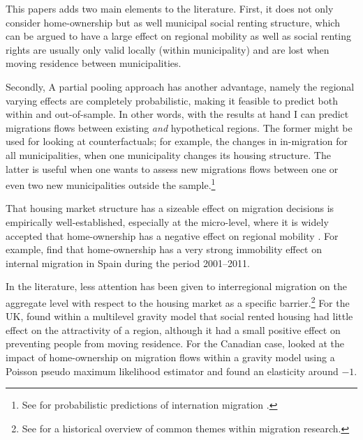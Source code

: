 \documentclass[fleqn,10pt]{SelfArx} %
\begin{document}
        This papers adds two main elements to the literature. First, it does not
        only consider home-ownership but as well municipal social renting
        structure, which can be argued \citep[see, e.g.,][]{boyle1998migration,
          hughes1981council} to have a large effect on regional mobility as well
        as social renting rights are usually only valid locally (within
        municipality) and are lost when moving residence between municipalities.
        
        Secondly, A partial pooling approach has another advantage, namely the
        regional varying effects are completely probabilistic, making it
        feasible to predict both within and out-of-sample. In other words, with
        the results at hand I can predict migrations flows between existing
        \emph{and} hypothetical regions. The former might be used for looking at
        counterfactuals; for example, the changes in in-migration for all
        municipalities, when one municipality changes its housing structure. The
        latter is useful when one wants to assess new migrations flows between
        one or even two new municipalities outside the sample.\footnote{See for
          probabilistic predictions of internation migration
          \cite{azose2015bayesian}.}
        
        That housing market structure has a sizeable effect on migration
        decisions is empirically well-established, especially at the
        micro-level, where it is widely accepted that home-ownership has a
        negative effect on regional mobility \citep{dietz2003social,
          dohmen2005housing}. For example, \citet{palomares2018understanding}
        find that home-ownership has a very strong immobility effect on internal
        migration in Spain during the period 2001--2011.
        
        In the literature, less attention has been given to interregional
        migration on the aggregate level with respect to the housing market as a
        specific barrier.\footnote{See \citet{cushing2004crossing} for a
          historical overview of common themes within migration research.} For
        the UK, \citet{congdon2010random} found within a multilevel gravity
        model that social rented housing had little effect on the attractivity
        of a region, although it had a small positive effect on preventing
        people from moving residence. For the Canadian case,
        \citet{amirault2016drags} looked at the impact of home-ownership on
        migration flows within a gravity model using a Poisson pseudo maximum
        likelihood estimator and found an elasticity around $-1$.
\end{document}
